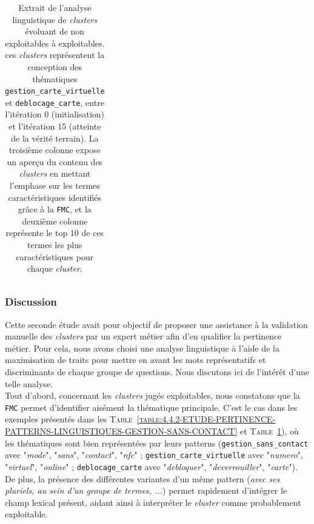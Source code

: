\begin{table}[!htb]
\begin{center}
\begin{tabular}{|c|l|l|}
				\end{tabular}
				\end{center}
				\caption{
					Extrait de l'analyse linguistique de \textit{clusters} évoluant de non exploitables à exploitables.
					ces \textit{clusters} représentent la conception des thématiques \texttt{gestion\_carte\_virtuelle} et \texttt{deblocage\_carte}, entre l'itération $0$ (initialisation) et l'itération $15$ (atteinte de la vérité terrain).
					La troisième colonne expose un aperçu du contenu des \textit{clusters} en mettant l'emphase sur les termes caractéristiques identifiés grâce à la \texttt{FMC}, et la deuxième colonne représente le top $10$ de ces termes les plus caractéristiques pour chaque \textit{cluster}.
				}
				\label{table:4.4.2-ETUDE-PERTINENCE-PATTERNS-LINGUISTIQUES-DEBLOCAGE-CARTE-GESTION-CARTE-VIRTUELLE}
			\end{table}

		\subsubsection{Discussion}
		
			Cette seconde étude avait pour objectif de proposer une assistance à la validation manuelle des \textit{clusters} par un expert métier afin d'en qualifier la pertinence métier.
			Pour cela, nous avons choisi une analyse linguistique à l'aide de la maximisation de traits pour mettre en avant les mots représentatifs et discriminants de chaque groupe de questions.
			Nous discutons ici de l'intérêt d'une telle analyse.
			\\
			
			Tout d'abord, concernant les \textit{clusters} jugés exploitables, nous constatons que la \texttt{FMC} permet d'identifier aisément la thématique principale.
			C'est le cas dans les exemples présentés dans les \textsc{Table~\ref{table:4.4.2-ETUDE-PERTINENCE-PATTERNS-LINGUISTIQUES-GESTION-SANS-CONTACT}} et \textsc{Table~\ref{table:4.4.2-ETUDE-PERTINENCE-PATTERNS-LINGUISTIQUES-DEBLOCAGE-CARTE-GESTION-CARTE-VIRTUELLE}}), où les thématiques sont bien représentées par leurs patterns (\texttt{gestion\_sans\_contact} avec "\textit{mode}", "\textit{sans}", "\textit{contact}", "\textit{nfc}" ; \texttt{gestion\_carte\_virtuelle} avec "\textit{numero}", "\textit{virtuel}", "\textit{online}" ; \texttt{deblocage\_carte} avec "\textit{debloquer}", "\textit{deverrouiller}", "\textit{carte}").
			De plus, la présence des différentes variantes d'un même pattern (\textit{avec ses pluriels, au sein d'un groupe de termes, ...}) permet rapidement d'intégrer le champ lexical présent, aidant ainsi à interpréter le \textit{cluster} comme probablement exploitable.
			

